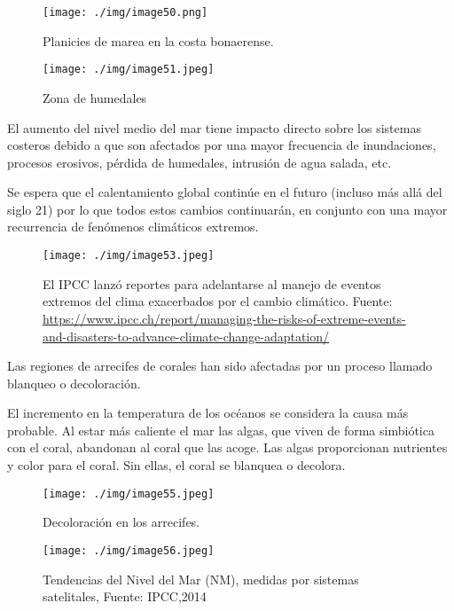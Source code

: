 \documentclass[
  a4paper,12pt]{extarticle}
\begin{document}
\begin{figure}
\begin{minipage}{0.48\textwidth}

\texttt{[image: ./img/image50.png]}

\caption{ Planicies de marea en la costa bonaerense. }
\end{minipage}\hfill%
\begin{minipage}{0.48\textwidth}

\texttt{[image: ./img/image51.jpeg]}

\caption{ Zona de humedales}
\end{minipage}
\end{figure}

El aumento del nivel medio del mar tiene impacto directo sobre los
sistemas costeros debido a que son afectados por una mayor frecuencia de
inundaciones, procesos erosivos, pérdida de humedales, intrusión de agua
salada, etc.

Se espera que el calentamiento global continúe en el futuro (incluso más
allá del siglo 21) por lo que todos estos cambios continuarán, en
conjunto con una mayor recurrencia de fenómenos climáticos extremos.

\begin{figure}
\centering
\texttt{[image: ./img/image53.jpeg]}
\caption{El IPCC lanzó reportes para adelantarse al manejo de eventos
extremos del clima exacerbados por el cambio climático. Fuente:
\url{https://www.ipcc.ch/report/managing-the-risks-of-extreme-events-and-disasters-to-advance-climate-change-adaptation/}}
\end{figure}

Las regiones de arrecifes de corales han sido afectadas por un proceso
llamado blanqueo o decoloración.

El incremento en la temperatura de los océanos se considera la causa más
probable. Al estar más caliente el mar las algas, que viven de forma
simbiótica con el coral, abandonan al coral que las acoge. Las algas
proporcionan nutrientes y color para el coral. Sin ellas, el coral se
blanquea o decolora.

\begin{figure}
\centering
\texttt{[image: ./img/image55.jpeg]}
\caption{Decoloración en los arrecifes.}
\end{figure}

\begin{figure}
\centering
\texttt{[image: ./img/image56.jpeg]}
\caption{Tendencias del Nivel del Mar (NM), medidas por sistemas
satelitales, Fuente: IPCC,2014}
\end{figure}
\end{document}
